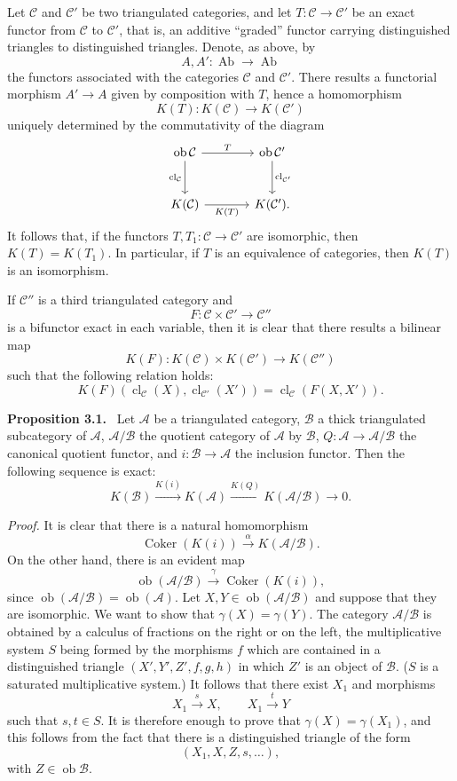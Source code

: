 \documentclass[11pt]{article}
\newenvironment{statement}[1]{\par\medskip\noindent\textbf{#1.}\ }{\par\medskip}
\providecommand{\Ob}{\operatorname{ob}}
\providecommand{\cC}{\mathcal C}
\providecommand{\Ob}{\operatorname{ob}}
\providecommand{\Ab}{\operatorname{Ab}}
\providecommand{\cC}{\mathcal C}
\providecommand{\cA}{\mathcal A}
\providecommand{\cB}{\mathcal B}
\providecommand{\Ab}{\operatorname{Ab}}
\providecommand{\Ob}{\operatorname{Ob}}
\providecommand{\Ob}{\operatorname{ob}}
\providecommand{\Ob}{\operatorname{Ob}}
\begin{document}
Let $\cC$ and $\cC'$ be two triangulated categories, and let $T:\cC\to\cC'$ be an exact functor from $\cC$ to $\cC'$, that is, an additive ``graded'' functor carrying distinguished triangles to distinguished triangles. Denote, as above, by
\[
A,A':\Ab\longrightarrow\Ab
\]
the functors associated with the categories $\cC$ and $\cC'$. There results a functorial morphism $A'\to A$ given by composition with $T$, hence a homomorphism
\[
K(T):K(\cC)\longrightarrow K(\cC')
\]
uniquely determined by the commutativity of the diagram
\[
\begin{tikzcd}[column sep=large,row sep=large]
\Ob\cC \arrow[r,"T"] \arrow[d,"\operatorname{cl}_{\cC}"']&
\Ob\cC' \arrow[d,"\operatorname{cl}_{\cC'}"]\\
K(\cC) \arrow[r,"K(T)"']& K(\cC').
\end{tikzcd}
\]
It follows that, if the functors $T,T_1:\cC\to\cC'$ are isomorphic, then $K(T)=K(T_1)$. In particular, if $T$ is an equivalence of categories, then $K(T)$ is an isomorphism.

If $\cC''$ is a third triangulated category and
\[
F:\cC\times\cC'\longrightarrow \cC''
\]
is a bifunctor exact in each variable, then it is clear that there results a bilinear map
\[
K(F):K(\cC)\times K(\cC')\longrightarrow K(\cC'')
\]
such that the following relation holds:
\[
K(F)(\operatorname{cl}_{\cC}(X),\operatorname{cl}_{\cC'}(X'))
=
\operatorname{cl}_{\cC}(F(X,X')).
\]

\begin{statement}{Proposition 3.1}
Let $\cA$ be a triangulated category, $\cB$ a thick triangulated subcategory of $\cA$, $\cA/\cB$ the quotient category of $\cA$ by $\cB$, $Q:\cA\to\cA/\cB$ the canonical quotient functor, and $i:\cB\to\cA$ the inclusion functor. Then the following sequence is exact:
\[
K(\cB)\xrightarrow{K(i)}K(\cA)\xrightarrow{K(Q)}K(\cA/\cB)\longrightarrow 0.
\]
\end{statement}

\emph{Proof.} It is clear that there is a natural homomorphism
\[
\operatorname{Coker}(K(i))\xrightarrow{\alpha}K(\cA/\cB).
\]
On the other hand, there is an evident map
\[
\Ob(\cA/\cB)\xrightarrow{\gamma}\operatorname{Coker}(K(i)),
\]
since $\Ob(\cA/\cB)=\Ob(\cA)$. Let $X,Y\in\Ob(\cA/\cB)$ and suppose that they are isomorphic. We want to show that $\gamma(X)=\gamma(Y)$. The category $\cA/\cB$ is obtained by a calculus of fractions on the right or on the left, the multiplicative system $S$ being formed by the morphisms $f$ which are contained in a distinguished triangle $(X',Y',Z',f,g,h)$ in which $Z'$ is an object of $\cB$. ($S$ is a saturated multiplicative system.) It follows that there exist $X_1$ and morphisms
\[
X_1\xrightarrow{s}X,\qquad X_1\xrightarrow{t}Y
\]
such that $s,t\in S$. It is therefore enough to prove that $\gamma(X)=\gamma(X_1)$, and this follows from the fact that there is a distinguished triangle of the form
\[
(X_1,X,Z,s,\ldots),
\]
with $Z\in\Ob\cB$.
\end{document}
